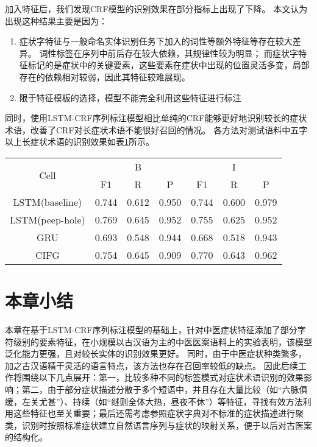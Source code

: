 加入特征后，我们发现CRF模型的识别效果在部分指标上出现了下降。
本文认为出现这种结果主要是因为：
\begin{enumerate}[leftmargin=*]
    \item[(1)] 症状字特征与一般命名实体识别任务下加入的词性等额外特征等存在较大差异。
        词性标签在序列中前后存在较大依赖，其规律性较为明显；
        而症状字特征标记的是症状中的关键要素，这些要素在症状中出现的位置灵活多变，局部存在的依赖相对较弱，因此其特征较难展现。
    \item[(2)] 限于特征模板的选择，模型不能完全利用这些特征进行标注
\end{enumerate}

同时，使用LSTM-CRF序列标注模型相比单纯的CRF能够更好地识别较长的症状术语，改善了CRF对长症状术语不能很好召回的情况\citep{王世昆2009基于条件随机场的中医命名实体识别}。
各方法对测试语料中五字以上长症状术语的识别效果如表\ref{tab:tab2}所示。

\begin{table}[H]
    \centering
    \begin{tabular}{ccccccc}
        \toprule
            \multirow{2}{*}{Cell} & \multicolumn{3}{c}{B} & \multicolumn{3}{c}{I}\\
            \cmidrule(lr){2-4} \cmidrule(lr){5-7}
            & F1 & R & P & F1 & R & P\\
        \midrule
        {LSTM}{(baseline)} & 0.744&0.612&0.950&0.744&0.600&0.979\\
        {LSTM}{(peep-hole)} & 0.769&0.645&0.952&0.755&0.625&0.952\\
        {GRU} & 0.693&0.548&0.944&0.668&0.518&0.943\\
        {CIFG} & 0.754&0.645&0.909&0.770&0.643&0.962\\
        \bottomrule
    \end{tabular}
    \label{tab:tab2}
\end{table}

\section{本章小结}
本章在基于LSTM-CRF序列标注模型的基础上，针对中医症状特征添加了部分字符级别的要素特征，在小规模以古汉语为主的中医医案语料上的实验表明，该模型泛化能力更强，且对较长实体的识别效果更好。
同时，由于中医症状种类繁多，加之古汉语精干灵活的语言特点，该方法也存在召回率较低的缺点。
因此后续工作将围绕以下几点展开：第一，比较多种不同的标签模式对症状术语识别的效果影响；第二，由于部分症状描述分散于多个短语中，并且存在大量比较（如“六脉俱缓，左关尤甚”）、持续（如“继则全体大热，昼夜不休”）等特征，寻找有效方法利用这些特征也至关重要；最后还需考虑参照症状字典对不标准的症状描述进行聚类，识别时按照标准症状建立自然语言序列与症状的映射关系，便于以后对古医案的结构化。



